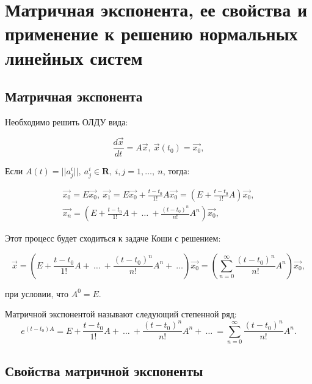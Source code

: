 



\section{Матричная экспонента, ее свойства и применение к решению нормальных линейных систем}

\subsection{Матричная экспонента}
Необходимо решить ОЛДУ вида:

\begin{equation}
  	\frac{d\vec{x}}{dt} = A\vec{x},\ \vec{x}(t_0) = \vec{x_0},
  	\label{Issue5_1}
\end{equation}

Если $A(t) = ||a_j^i||,\ a_j^i \in \mathbf{R},\ i,j = 1,\dots,\ n$, тогда:

\begin{equation*}
\begin{gathered}
         \vec{x_{0}} = E\vec{x_0},\ \vec{x_1} = E\vec{x_0} + \frac{t-t_0}{1!}A\vec{x_0} = \left(E + \frac{t-t_0}{1!}A\right) \vec{x_0}, \\  
         \vec{x_n} = \left(E + \frac{t-t_0}{1!}A +\ \dots\ + \frac{(t-t_0)^n}{n!}A^n\right)\vec{x_0},	 
\end{gathered}
\end{equation*}

Этот процесс будет сходиться к задаче Коши с решением:

\begin{equation*}
   	\vec{x} = \left(E + \frac{t-t_0}{1!}A +\ \dots\ + \frac{(t-t_0)^n}{n!}A^n+\ \dots \right)\vec{x_0} = \left(\sum\limits_{n = 0}^{\infty} \frac{(t-t_0)^n}{n!}A^n\right)\vec{x_0},	 
\end{equation*}

при условии, что $A^0 = E.$

\begin{definition}
	Матричной экспонентой называют следующий степенной ряд:
	\begin{equation*}
		e^{(t-t_0)A} = E + \frac{t-t_0}{1!}A +\ \dots\ + \frac{(t-t_0)^n}{n!}A^n+\ \dots\ = \sum\limits_{n = 0}^{\infty} \frac{(t-t_0)^n}{n!}A^n.
	\end{equation*}
\end{definition}

\subsection{Свойства матричной экспоненты}

